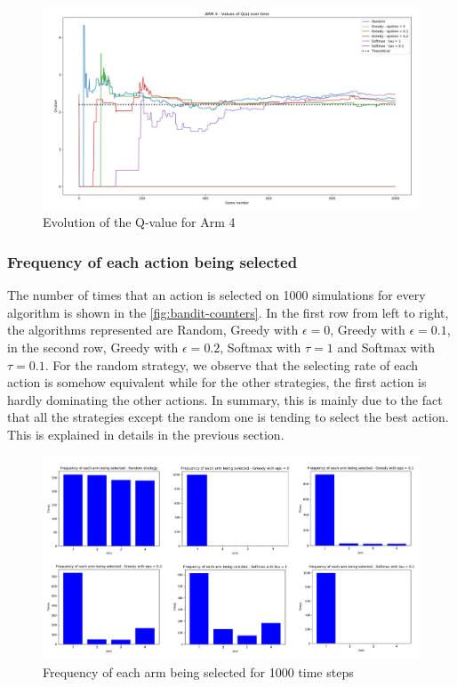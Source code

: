 \documentclass{article}
\begin{document}
\begin{figure}[H]
  \centering
  \includegraphics[scale=0.35]{fig/bandit-arm4.png}
  \caption{Evolution of the Q-value for Arm 4}
  \label{fig:bandit-arm4}
\end{figure}

\newpage
\subsubsection{Frequency of each action being selected}

The number of times that an action is selected on 1000 simulations for every algorithm is shown in the \autoref{fig:bandit-counters}. In the first row from left to right, the algorithms represented are Random, Greedy with $\epsilon = 0$, Greedy with $\epsilon = 0.1$, in the second row, Greedy with $\epsilon = 0.2$, Softmax with $\tau = 1$ and Softmax with $\tau = 0.1$. For the random strategy, we observe that the selecting rate of each action is somehow equivalent while for the other strategies, the first action is hardly dominating the other actions. In summary, this is mainly due to the fact that all the strategies except the random one is tending to select the best action. This is explained in details in the previous section. 

\begin{figure}[H]
  \centering
  \includegraphics[scale=1]{fig/bandit-counters.png}
  \caption{Frequency of each arm being selected for 1000 time steps}
  \label{fig:bandit-counters}
\end{figure}
\end{document}
